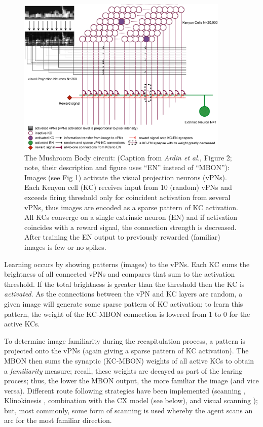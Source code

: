 \documentclass[a4paper,11pt,twoside,openright]{article}
\begin{document}
\begin{figure}
  \centering
  \includegraphics[width=0.9\textwidth]{Ardin2010MBModel}
  \caption{\label{fig:mb} The Mushroom Body circuit: (Caption from
    \textit{Ardin et al.}, Figure 2; note, their description and figure uses
    ``EN'' instead of ``MBON''): Images (see Fig 1) activate the visual
    projection neurons (vPNs). Each Kenyon cell (KC) receives input from 10
    (random) vPNs and exceeds firing threshold only for coincident activation
    from several vPNs, thus images are encoded as a sparse pattern of KC
    activation. All KCs converge on a single extrinsic neuron (EN) and if
    activation coincides with a reward signal, the connection strength is
    decreased. After training the EN output to previously rewarded (familiar)
    images is few or no spikes.}
\end{figure}

Learning occurs by showing patterns (images) to the vPNs. Each KC sums the
brightness of all connected vPNs and compares that sum to the activation
threshold. If the total brightness is greater than the threshold then the KC is
\textit{activated}. As the connections between the vPN and KC layers are random,
a given image will generate some sparse pattern of KC activation; to learn this
pattern, the weight of the KC-MBON connection is lowered from 1 to 0 for the
active KCs.
\newline
\par

To determine image familiarity during the recapitulation process, a pattern is
projected onto the vPNs (again giving a sparse pattern of KC activation).
The MBON then sums the synaptic (KC-MBON) weights of all active KCs to obtain a
\textit{familiarity} measure; recall, these weights are decayed as part of the
learing process; thus, the lower the MBON output, the more familiar the image
(and vice versa). Different route following strategies have been implemented
(scanning \cite{Ardin2016, Eberding2016, Zhang2017}, Klinokinesis
\cite{Zhang2017}, combination with the CX model \cite{Zhang2017}(see below), and
visual scanning \cite{Mitchell2018}); but, most commonly, some form of scanning
is used whereby the agent scans an arc for the most familiar direction.
\newline
\par
\end{document}
